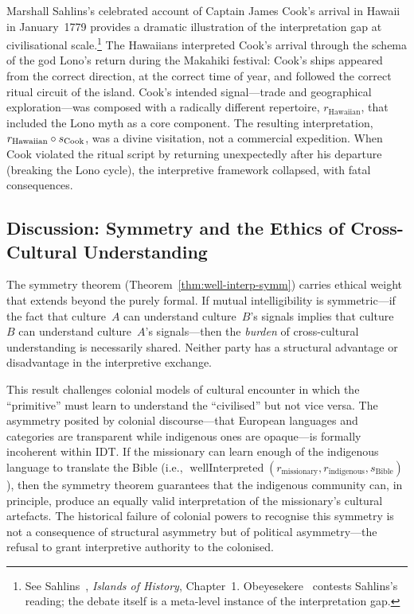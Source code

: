\begin{example}
Marshall Sahlins's celebrated account of Captain James Cook's arrival in
Hawaii in January~1779 provides a dramatic illustration of the
interpretation gap at civilisational scale.\footnote{See
Sahlins~\cite{sahlins1985}, \textit{Islands of History}, Chapter~1.
Obeyesekere~\cite{obeyesekere1992} contests Sahlins's reading; the
debate itself is a meta-level instance of the interpretation gap.}  The
Hawaiians interpreted Cook's arrival through the schema of the god
Lono's return during the Makahiki festival: Cook's ships appeared from
the correct direction, at the correct time of year, and followed the
correct ritual circuit of the island.  Cook's intended signal---trade and
geographical exploration---was composed with a radically different
repertoire, $r_{\mathrm{Hawaiian}}$, that included the Lono myth as a
core component.  The resulting interpretation,
$r_{\mathrm{Hawaiian}} \circ s_{\mathrm{Cook}}$, was a divine
visitation, not a commercial expedition.  When Cook violated the ritual
script by returning unexpectedly after his departure (breaking the Lono
cycle), the interpretive framework collapsed, with fatal consequences.
\end{example}

\subsection*{Discussion: Symmetry and the Ethics of Cross-Cultural Understanding}

The symmetry theorem (Theorem~\ref{thm:well-interp-symm}) carries
ethical weight that extends beyond the purely formal.  If mutual
intelligibility is symmetric---if the fact that culture~$A$ can
understand culture~$B$'s signals implies that culture~$B$ can understand
culture~$A$'s signals---then the \emph{burden} of cross-cultural
understanding is necessarily shared.  Neither party has a structural
advantage or disadvantage in the interpretive exchange.

This result challenges colonial models of cultural encounter in which the
``primitive'' must learn to understand the ``civilised'' but not vice
versa.  The asymmetry posited by colonial discourse---that European
languages and categories are transparent while indigenous ones are
opaque---is formally incoherent within IDT\@.  If the missionary can
learn enough of the indigenous language to translate the Bible (i.e.,
$\operatorname{wellInterpreted}(r_{\mathrm{missionary}},
r_{\mathrm{indigenous}}, s_{\mathrm{Bible}})$), then the symmetry
theorem guarantees that the indigenous community can, in principle,
produce an equally valid interpretation of the missionary's cultural
artefacts.  The historical failure of colonial powers to recognise this
symmetry is not a consequence of structural asymmetry but of political
asymmetry---the refusal to grant interpretive authority to the colonised.

